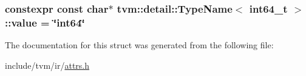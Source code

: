 \subsubsection[{\texorpdfstring{value}{value}}]{\setlength{\rightskip}{0pt plus 5cm}constexpr const char$\ast$ {\bf tvm\+::detail\+::\+Type\+Name}$<$ int64\+\_\+t $>$\+::value = \char`\"{}int64\char`\"{}\hspace{0.3cm}{\ttfamily [static]}}\hypertarget{structtvm_1_1detail_1_1TypeName_3_01int64__t_01_4_a0c4adfb05b647001a3b365b723269fa4}{}\label{structtvm_1_1detail_1_1TypeName_3_01int64__t_01_4_a0c4adfb05b647001a3b365b723269fa4}


The documentation for this struct was generated from the following file\+:\begin{DoxyCompactItemize}
\item 
include/tvm/ir/\hyperlink{ir_2attrs_8h}{attrs.\+h}\end{DoxyCompactItemize}
